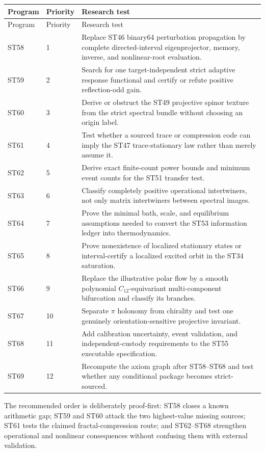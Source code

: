 \documentclass[11pt,a4paper]{article}
\begin{document}
\small
\begin{longtable}{@{}p{}p{}p{}@{}}
\toprule
Program & Priority & Research test\\
\midrule
\endfirsthead
\toprule
Program & Priority & Research test\\
\midrule
\endhead
ST58 & 1 & Replace ST46 binary64 perturbation propagation by complete directed-interval eigenprojector, memory, inverse, and nonlinear-root evaluation.\\
ST59 & 2 & Search for one target-independent strict adaptive response functional and certify or refute positive reflection-odd gain.\\
ST60 & 3 & Derive or obstruct the ST49 projective spinor texture from the strict spectral bundle without choosing an origin label.\\
ST61 & 4 & Test whether a sourced trace or compression code can imply the ST47 trace-stationary law rather than merely assume it.\\
ST62 & 5 & Derive exact finite-count power bounds and minimum event counts for the ST51 transfer test.\\
ST63 & 6 & Classify completely positive operational intertwiners, not only matrix intertwiners between spectral images.\\
ST64 & 7 & Prove the minimal bath, scale, and equilibrium assumptions needed to convert the ST53 information ledger into thermodynamics.\\
ST65 & 8 & Prove nonexistence of localized stationary states or interval-certify a localized excited orbit in the ST34 saturation.\\
ST66 & 9 & Replace the illustrative polar flow by a smooth polynomial $C_{12}$-equivariant multi-component bifurcation and classify its branches.\\
ST67 & 10 & Separate $\pi$ holonomy from chirality and test one genuinely orientation-sensitive projective invariant.\\
ST68 & 11 & Add calibration uncertainty, event validation, and independent-custody requirements to the ST55 executable specification.\\
ST69 & 12 & Recompute the axiom graph after ST58--ST68 and test whether any conditional package becomes strict-sourced.\\
\bottomrule
\end{longtable}
\normalsize

The recommended order is deliberately proof-first: ST58 closes a known arithmetic gap; ST59 and ST60 attack the two highest-value missing sources; ST61 tests the claimed fractal-compression route; and ST62--ST68 strengthen operational and nonlinear consequences without confusing them with external validation.
\end{document}

